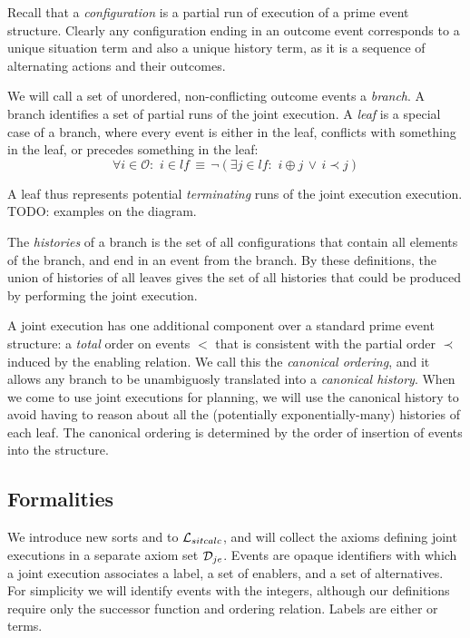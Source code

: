 Recall that a \emph{configuration} is a partial run of execution of
a prime event structure. Clearly any configuration ending in an outcome
event corresponds to a unique situation term and also a unique history
term, as it is a sequence of alternating actions and their outcomes.

We will call a set of unordered, non-conflicting outcome events a
\emph{branch}. A branch identifies a set of partial runs of the joint
execution. A \emph{leaf} is a special case of a branch, where every
event is either in the leaf, conflicts with something in the leaf,
or precedes something in the leaf: \[
\forall i\in\mathcal{O}:\,\, i\in lf\,\equiv\,\neg(\exists j\in lf:\,\, i\oplus j\,\vee\, i\prec j)\]


A leaf thus represents potential \emph{terminating} runs of the joint
execution execution. TODO: examples on the diagram.

The \emph{histories} of a branch is the set of all configurations
that contain all elements of the branch, and end in an event from
the branch. By these definitions, the union of histories of all leaves
gives the set of all histories that could be produced by performing
the joint execution.

A joint execution has one additional component over a standard prime
event structure: a \emph{total} order on events $<$ that is consistent
with the partial order $\prec$ induced by the enabling relation.
We call this the \emph{canonical ordering}, and it allows any branch
to be unambiguosly translated into a \emph{canonical history}. When
we come to use joint executions for planning, we will use the canonical
history to avoid having to reason about all the (potentially exponentially-many)
histories of each leaf. The canonical ordering is determined by the
order of insertion of events into the structure.


\subsection{Formalities}

We introduce new sorts and  to $\mathcal{L}_{sitcalc}$,
and will collect the axioms defining joint executions in a separate
axiom set $\mathcal{D}_{je}$. Events are opaque identifiers with which a
joint execution associates a label, a set of enablers, and a set of
alternatives. For simplicity we will identify events with the integers,
although our definitions require only the successor function and ordering
relation. Labels are either  or  terms.

